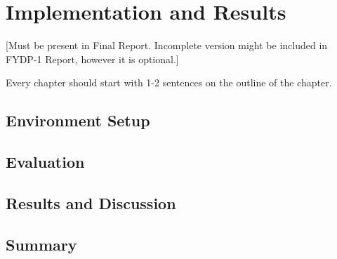 \chapter{Implementation and Results}

[Must be present in Final Report. Incomplete version might be included in FYDP-1 Report, however it is optional.]

Every chapter should start with 1-2 sentences on the outline of the chapter.

\section{Environment Setup}
\section{Evaluation}
\section{Results and Discussion}
\section{Summary}